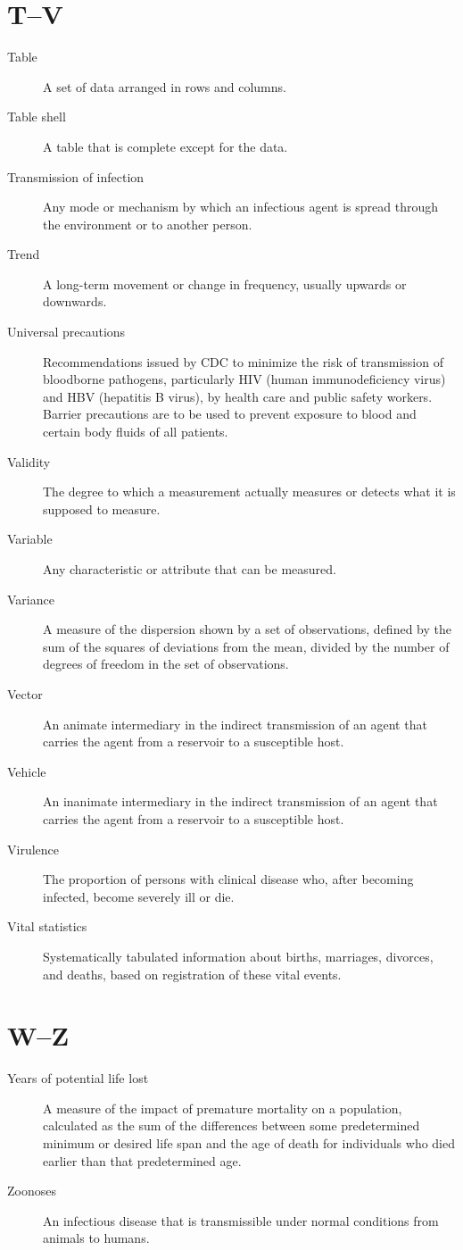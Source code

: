 \documentclass[11pt]{article}
\begin{document}
\section*{T--V}

\begin{description}
\item[Table] A set of data arranged in rows and columns.
\item[Table shell] A table that is complete except for the data.
\item[Transmission of infection] Any mode or mechanism by which
an infectious agent is spread through the environment or to
another person.
\item[Trend] A long-term movement or change in frequency, usually
upwards or downwards.
\item[Universal precautions] Recommendations issued by CDC to
minimize the risk of transmission of bloodborne pathogens,
particularly HIV (human immunodeficiency virus) and HBV
(hepatitis B virus), by health care and public safety workers.
Barrier precautions are to be used to prevent exposure to blood
and certain body fluids of all patients.
\item[Validity] The degree to which a measurement actually
measures or detects what it is supposed to measure.
\item[Variable] Any characteristic or attribute that can be
measured.
\item[Variance] A measure of the dispersion shown by a set of
observations, defined by the sum of the squares of deviations
from the mean, divided by the number of degrees of freedom in
the set of observations.
\item[Vector] An animate intermediary in the indirect
transmission of an agent that carries the agent from a reservoir
to a susceptible host.
\item[Vehicle] An inanimate intermediary in the indirect
transmission of an agent that carries the agent from a reservoir
to a susceptible host.
\item[Virulence] The proportion of persons with clinical disease
who, after becoming infected, become severely ill or die.
\item[Vital statistics] Systematically tabulated information
about births, marriages, divorces, and deaths, based on
registration of these vital events.
\end{description}

\section*{W--Z}

\begin{description}
\item[Years of potential life lost] A measure of the impact of
premature mortality on a population, calculated as the sum of the
differences between some predetermined minimum or desired life
span and the age of death for individuals who died earlier than
that predetermined age.
\item[Zoonoses] An infectious disease that is transmissible under
normal conditions from animals to humans.
\end{description}
\end{document}
